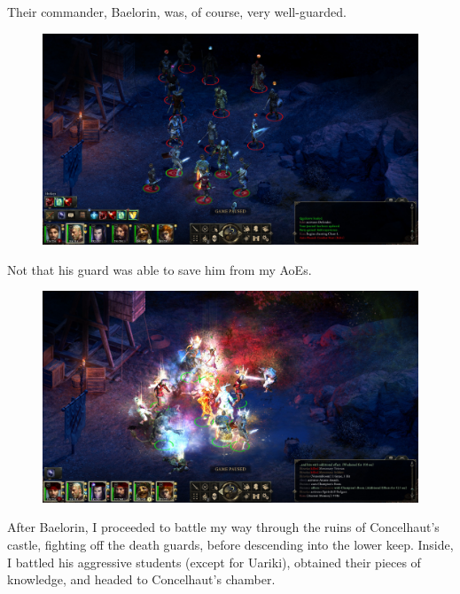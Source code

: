 \documentclass{article}
\begin{document}
Their commander, Baelorin, was, of course, very well-guarded.

\begin{figure}
\includegraphics[scale=0.33]{files/blog/2019_08_17_poe_potd_wmpt1/2019_08_17_cragholdt_bluffs_2.jpg}
\end{figure}

Not that his guard was able to save him from my AoEs.

\begin{figure}
\includegraphics[scale=0.33]{files/blog/2019_08_17_poe_potd_wmpt1/2019_08_17_cragholdt_bluffs_3.jpg}
\end{figure}

After Baelorin, I proceeded to battle my way through the ruins of Concelhaut's castle, fighting off the death guards, before descending into the lower keep.  Inside, I battled his aggressive students (except for Uariki), obtained their pieces of knowledge, and headed to Concelhaut's chamber.
\end{document}
